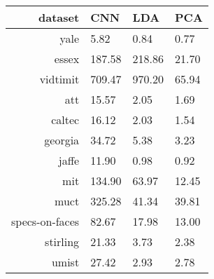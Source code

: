 \begin{tabular}{|r|l|l|l|}
  \hline
  \rowcolor{Gray}
  dataset & CNN & LDA & PCA \\
  \hline
  yale & 5.82 & 0.84 & 0.77 \\
  \hline
  essex & 187.58 & 218.86 & 21.70 \\
  \hline
  vidtimit & 709.47 & 970.20 & 65.94 \\
  \hline
  att & 15.57 & 2.05 & 1.69 \\
  \hline
  caltec & 16.12 & 2.03 & 1.54 \\
  \hline
  georgia & 34.72 & 5.38 & 3.23 \\
  \hline
  jaffe & 11.90 & 0.98 & 0.92 \\
  \hline
  mit & 134.90 & 63.97 & 12.45 \\
  \hline
  muct & 325.28 & 41.34 & 39.81 \\
  \hline
  specs-on-faces & 82.67 & 17.98 & 13.00 \\
  \hline
  stirling & 21.33 & 3.73 & 2.38 \\
  \hline
  umist & 27.42 & 2.93 & 2.78 \\
  \hline
\end{tabular}
